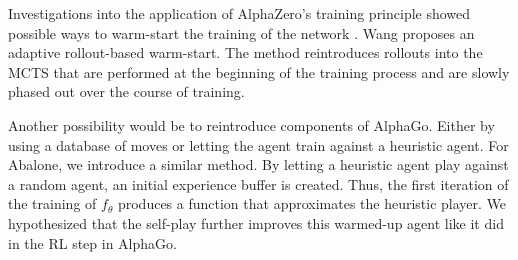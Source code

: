 Investigations into the application of AlphaZero's training principle showed possible ways to warm-start the training of the network \cite{wang_adaptive_2021}. Wang proposes an adaptive rollout-based warm-start. The method reintroduces rollouts into the MCTS that are performed at the beginning of the training process and are slowly phased out over the course of training.

Another possibility would be to reintroduce components of AlphaGo. Either by using a database of moves or letting the agent train against a heuristic agent. For Abalone, we introduce a similar method. By letting a heuristic agent play against a random agent, an initial experience buffer is created. Thus, the first iteration of the training of $f_{\theta}$ produces a function that approximates the heuristic player. We hypothesized that the self-play further improves this warmed-up agent like it did in the RL step in AlphaGo.
